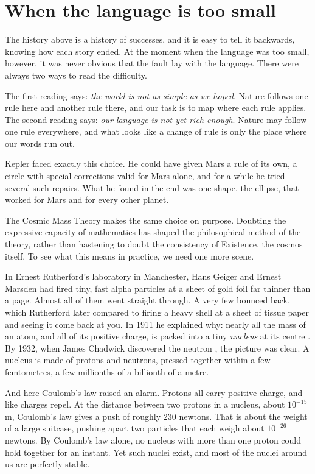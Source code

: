 \section{When the language is too small}\label{sec:too-small}

The history above is a history of successes, and it is easy to tell it backwards, knowing how each story ended. At the moment when the language was too small, however, it was never obvious that the fault lay with the language. There were always two ways to read the difficulty.

The first reading says: \emph{the world is not as simple as we hoped}. Nature follows one rule here and another rule there, and our task is to map where each rule applies. The second reading says: \emph{our language is not yet rich enough}. Nature may follow one rule everywhere, and what looks like a change of rule is only the place where our words run out.

Kepler faced exactly this choice. He could have given Mars a rule of its own, a circle with special corrections valid for Mars alone, and for a while he tried several such repairs. What he found in the end was one shape, the ellipse, that worked for Mars and for every other planet.

The Cosmic Mass Theory makes the same choice on purpose. Doubting the expressive capacity of mathematics has shaped the philosophical method of the theory, rather than hastening to doubt the consistency of Existence, the cosmos itself. To see what this means in practice, we need one more scene.


In Ernest Rutherford's laboratory in Manchester, Hans Geiger and Ernest Marsden had fired tiny, fast alpha particles at a sheet of gold foil far thinner than a page. Almost all of them went straight through. A very few bounced back, which Rutherford later compared to firing a heavy shell at a sheet of tissue paper and seeing it come back at you. In 1911 he explained why: nearly all the mass of an atom, and all of its positive charge, is packed into a tiny \emph{nucleus} at its centre \citep{Rutherford1911}. By 1932, when James Chadwick discovered the neutron \citep{Chadwick1932}, the picture was clear. A nucleus is made of protons and neutrons, pressed together within a few femtometres, a few millionths of a billionth of a metre.

And here Coulomb's law raised an alarm. Protons all carry positive charge, and like charges repel. At the distance between two protons in a nucleus, about $10^{-15}$ m, Coulomb's law gives a push of roughly $230$ newtons. That is about the weight of a large suitcase, pushing apart two particles that each weigh about $10^{-26}$ newtons. By Coulomb's law alone, no nucleus with more than one proton could hold together for an instant. Yet such nuclei exist, and most of the nuclei around us are perfectly stable.

